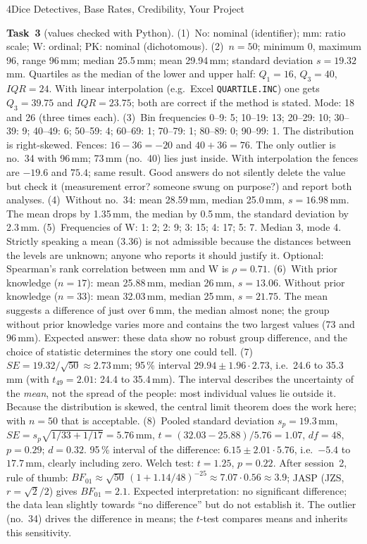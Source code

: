 \begin{uebungsblattb}{4}{Dice Detectives, Base Rates, Credibility, Your Project}
\begin{lehrhinweis}
\textbf{Task~3} (values checked with Python).
(1)~No: nominal (identifier); mm: ratio scale; W: ordinal; PK: nominal
(dichotomous).
(2)~$n=50$; minimum 0, maximum 96, range 96\,mm; median 25.5\,mm; mean
29.94\,mm; standard deviation $s=19.32$\,mm. Quartiles as the median of
the lower and upper half: $Q_1=16$, $Q_3=40$, $\mathit{IQR}=24$. With
linear interpolation (e.g.\ Excel \texttt{QUARTILE.INC}) one gets
$Q_3=39.75$ and $\mathit{IQR}=23.75$; both are correct if the method is
stated. Mode: 18 and 26 (three times each).
(3)~Bin frequencies 0--9: 5; 10--19: 13; 20--29: 10; 30--39: 9; 40--49: 6;
50--59: 4; 60--69: 1; 70--79: 1; 80--89: 0; 90--99: 1. The distribution
is right-skewed. Fences: $16-36=-20$ and $40+36=76$. The only outlier is
no.~34 with 96\,mm; 73\,mm (no.~40) lies just inside. With interpolation
the fences are $-19.6$ and $75.4$; same result. Good answers do not
silently delete the value but check it (measurement error? someone swung
on purpose?) and report both analyses.
(4)~Without no.~34: mean 28.59\,mm, median 25.0\,mm, $s=16.98$\,mm. The
mean drops by 1.35\,mm, the median by 0.5\,mm, the standard deviation by
2.3\,mm.
(5)~Frequencies of W: 1: 2; 2: 9; 3: 15; 4: 17; 5: 7. Median 3, mode 4.
Strictly speaking a mean (3.36) is not admissible because the distances
between the levels are unknown; anyone who reports it should justify it.
Optional: Spearman's rank correlation between mm and W is $\rho=0.71$.
(6)~With prior knowledge ($n=17$): mean 25.88\,mm, median 26\,mm,
$s=13.06$. Without prior knowledge ($n=33$): mean 32.03\,mm, median
25\,mm, $s=21.75$. The mean suggests a difference of just over 6\,mm,
the median almost none; the group without prior knowledge varies more
and contains the two largest values (73 and 96\,mm). Expected answer:
these data show no robust group difference, and the choice of statistic
determines the story one could tell.
(7)~$\mathit{SE}=19.32/\sqrt{50}\approx2.73$\,mm; 95\,\% interval
$29.94\pm1.96\cdot2.73$, i.e.\ 24.6 to 35.3\,mm (with $t_{49}=2.01$: 24.4
to 35.4\,mm). The interval describes the uncertainty of the \emph{mean},
not the spread of the people: most individual values lie outside it.
Because the distribution is skewed, the central limit theorem does the
work here; with $n=50$ that is acceptable.
(8)~Pooled standard deviation $s_p=19.3$\,mm,
$\mathit{SE}=s_p\sqrt{1/33+1/17}=5.76$\,mm,
$t=(32.03-25.88)/5.76=1.07$, $\mathit{df}=48$, $p=0.29$; $d=0.32$. 95\,\% interval of the difference:
$6.15\pm2.01\cdot5.76$, i.e.\ $-5.4$ to $17.7$\,mm, clearly including zero.
Welch test: $t=1.25$, $p=0.22$. After session~2, rule of thumb:
$\mathit{BF}_{01}\approx\sqrt{50}\,(1+1.14/48)^{-25}\approx7.07\cdot0.56\approx3.9$;
JASP (JZS, $r=\sqrt2/2$) gives $\mathit{BF}_{01}=2.1$. Expected
interpretation: no significant difference; the data lean slightly
towards \enquote{no difference} but do not establish it. The outlier
(no.~34) drives the difference in means; the $t$-test compares means and
inherits this sensitivity.


\end{lehrhinweis}
\end{uebungsblattb}
